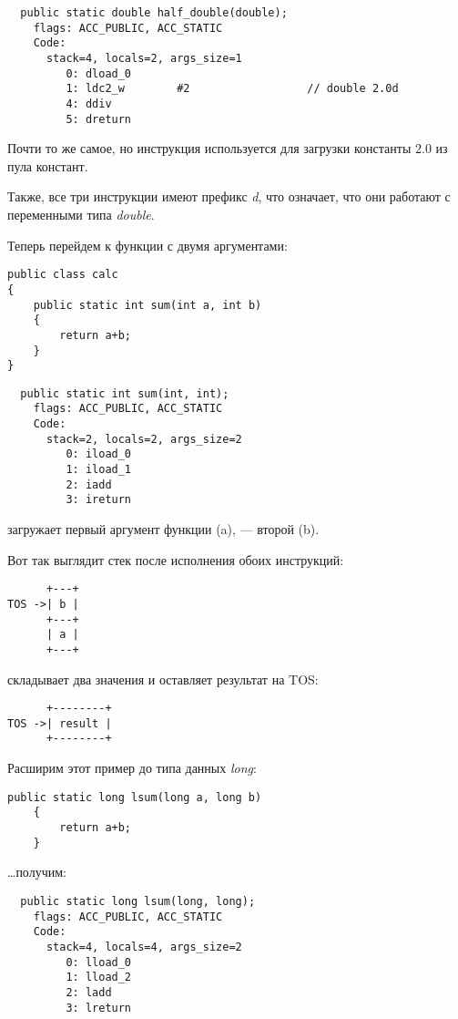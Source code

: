 \begin{lstlisting}
  public static double half_double(double);
    flags: ACC_PUBLIC, ACC_STATIC
    Code:
      stack=4, locals=2, args_size=1
         0: dload_0       
         1: ldc2_w        #2                  // double 2.0d
         4: ddiv          
         5: dreturn       
\end{lstlisting}


Почти то же самое, но инструкция  используется для загрузки константы 
2.0 из пула констант.

Также, все три инструкции имеют префикс \emph{d}, что означает, что они работают с переменными
типа \emph{double}.


Теперь перейдем к функции с двумя аргументами:

\begin{lstlisting}[style=customjava]
public class calc
{
	public static int sum(int a, int b)
	{
		return a+b;
	}
}
\end{lstlisting}

\begin{lstlisting}
  public static int sum(int, int);
    flags: ACC_PUBLIC, ACC_STATIC
    Code:
      stack=2, locals=2, args_size=2
         0: iload_0       
         1: iload_1       
         2: iadd          
         3: ireturn       
\end{lstlisting}


 загружает первый аргумент функции (a),  --- второй (b).

Вот так выглядит стек после исполнения обоих инструкций:

\begin{lstlisting}
      +---+
TOS ->| b |
      +---+
      | a |
      +---+
\end{lstlisting}


 складывает два значения и оставляет результат на \ac{TOS}:

\begin{lstlisting}
      +--------+
TOS ->| result |
      +--------+
\end{lstlisting}


Расширим этот пример до типа данных \emph{long}:

\begin{lstlisting}[style=customjava]
	public static long lsum(long a, long b)
	{
		return a+b;
	}
\end{lstlisting}

\dots получим:

\begin{lstlisting}
  public static long lsum(long, long);
    flags: ACC_PUBLIC, ACC_STATIC
    Code:
      stack=4, locals=4, args_size=2
         0: lload_0       
         1: lload_2       
         2: ladd          
         3: lreturn       
\end{lstlisting}


